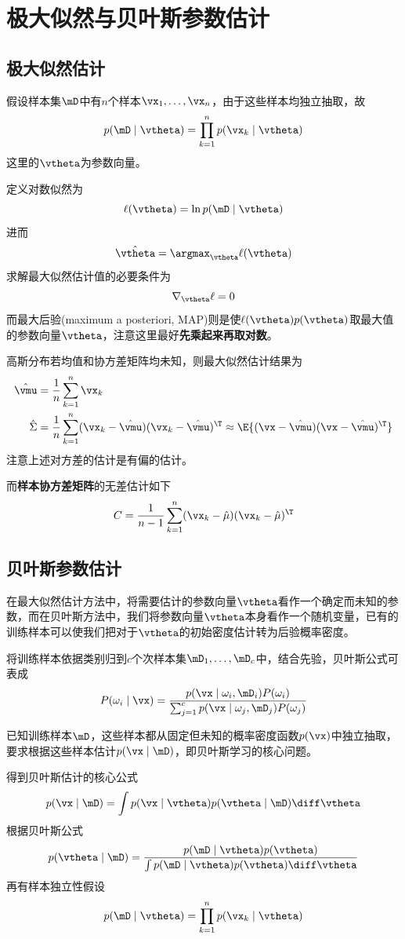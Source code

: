 
\section{极大似然与贝叶斯参数估计} %

\subsection{极大似然估计}
假设样本集$\mD$中有$n$个样本$\vx_1,\ldots,\vx_n$，由于这些样本均独立抽取，故
\[p(\mD\mid\vtheta)=\prod_{k=1}^np(\vx_k\mid\vtheta)\]
这里的$\vtheta$为参数向量。

定义对数似然为
\[\ell(\vtheta)=\ln p(\mD\mid\vtheta)\]
进而
\[\hat{\vtheta}=\argmax_{\vtheta}\ell(\vtheta)\]
求解最大似然估计值的必要条件为
\[\nabla_{\vtheta}\ell = 0\]
而最大后验(maximum a posteriori, MAP)则是使$\ell(\vtheta)p(\vtheta)$取最大值的参数向量$\vtheta$，注意这里最好\textbf{先乘起来再取对数}。

高斯分布若均值和协方差矩阵均未知，则最大似然估计结果为
\[\begin{aligned}
\hat{\vmu} &= \frac{1}{n}\sum_{k=1}^n\vx_k\\
\hat{\Sigma} &= \frac{1}{n}\sum_{k=1}^n(\vx_k-\hat{\vmu})(\vx_k-\hat{\vmu})^\T\approx\E{(\vx-\hat{\vmu})(\vx-\hat{\vmu})^\T}
\end{aligned}\]
注意上述对方差的估计是有偏的估计。

而\textbf{样本协方差矩阵}的无差估计如下
\[C=\frac{1}{n-1}\sum_{k=1}^n(\vx_k-\hat{\mu})(\vx_k-\hat{\mu})^\T\]

\subsection{贝叶斯参数估计}
在最大似然估计方法中，将需要估计的参数向量$\vtheta$看作一个确定而未知的参数，而在贝叶斯方法中，我们将参数向量$\vtheta$本身看作一个随机变量，已有的训练样本可以使我们把对于$\vtheta$的初始密度估计转为后验概率密度。

将训练样本依据类别归到$c$个次样本集$\mD_1,\ldots,\mD_c$中，结合先验，贝叶斯公式可表成
\[P(\omega_i\mid\vx)=\frac{p(\vx\mid\omega_i,\mD_i)P(\omega_i)}{\sum_{j=1}^cp(\vx\mid\omega_j,\mD_j)P(\omega_j)}\]

已知训练样本$\mD$，这些样本都从固定但未知的概率密度函数$p(\vx)$中独立抽取，要求根据这些样本估计$p(\vx\mid\mD)$，即贝叶斯学习的核心问题。

得到贝叶斯估计的核心公式
\[p(\vx\mid\mD)=\int p(\vx\mid\vtheta)p(\vtheta\mid\mD)\diff\vtheta\]
根据贝叶斯公式
\[p(\vtheta\mid\mD)=\frac{p(\mD\mid\vtheta)p(\vtheta)}{\int p(\mD\mid\vtheta)p(\vtheta)\diff\vtheta}\]
再有样本独立性假设
\[p(\mD\mid\vtheta)=\prod_{k=1}^n p(\vx_k\mid\vtheta)\]

